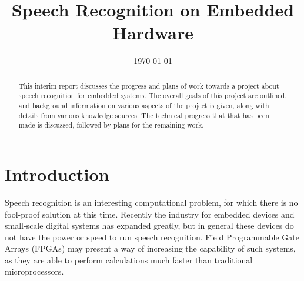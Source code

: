\documentclass{ecsreport}     				%
\begin{document}
\frontmatter
\title      {Speech Recognition on Embedded Hardware}
\addresses  {\groupname\\\deptname\\\univname}
\date       {\today}
\subject    {}
\keywords   {}
\maketitle
\begin{abstract}
This interim report discusses the progress and plans of work towards a project about speech recognition for embedded systems.  The overall goals of this project are outlined, and background information on various aspects of the project is given, along with details from various knowledge sources.  The technical progress that that has been made is discussed, followed by plans for the remaining work.
\end{abstract}
\tableofcontents
\mainmatter

\section{Introduction} %
\label{sec:introduction}
Speech recognition is an interesting computational problem, for which there is no fool-proof solution at this time.  Recently the industry for embedded devices and small-scale digital systems has expanded greatly, but in general these devices do not have the power or speed to run speech recognition.  Field Programmable Gate Arrays (FPGAs) may present a way of increasing the capability of such systems, as they are able to perform calculations much faster than traditional microprocessors.










\appendix

\backmatter

\end{document}
